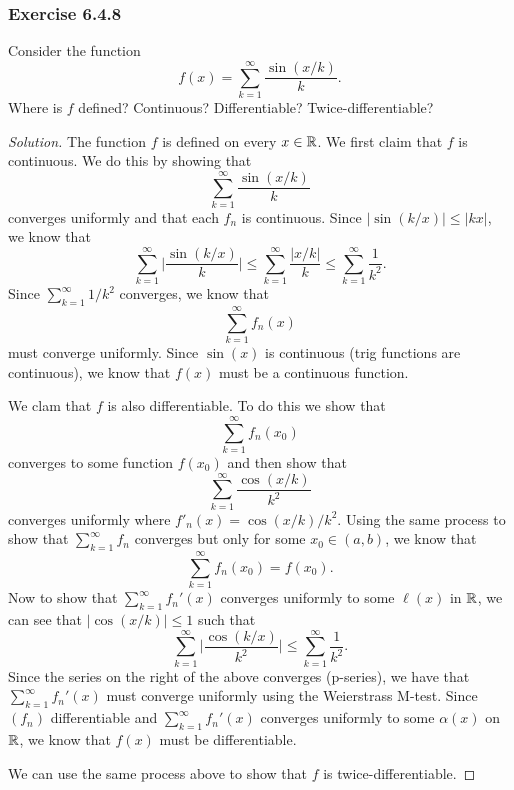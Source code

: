 \subsubsection{Exercise 6.4.8} Consider the function 
\[  f(x) = \sum_{ k=1 }^{  \infty  } \frac{ \sin(x / k) }{ k }.  \]
Where is \( f  \) defined? Continuous? Differentiable? Twice-differentiable?
\begin{proof}[Solution]
The function \( f  \) is defined on every \( x \in \mathbb{R}  \). We first claim that \( f  \) is continuous. We do this by showing that 
\[  \sum_{ k=1 }^{ \infty  } \frac{ \sin(x/k)  }{ k  }  \] converges uniformly and that each \( f_n  \) is continuous. Since \( | \sin(k/x)  |  \leq | kx  |  \), we know that 
\[ \sum_{ k=1 }^{ \infty  } \Big| \frac{ \sin(k/x)  }{  k  }   \Big|  \leq \sum_{ k=1 }^{ \infty  } \frac{ | x/k |   }{ k  } \leq \sum_{ k=1 }^{ \infty  } \frac{ 1 }{ k^2 }.    \]
Since \( \sum_{ k=1 }^{ \infty  } 1 / k^2  \) converges, we know that 
\[  \sum_{ k=1 }^{ \infty  } f_n(x)  \] must converge uniformly. Since \( \sin(x)  \) is continuous (trig functions are continuous), we know that \( f(x)   \) must be a continuous function. 

We clam that \( f  \) is also differentiable. To do this we show that 
\[  \sum_{ k=1 }^{ \infty  } f_n(x_0)  \]
converges to some function \( f(x_0) \) and then show that 
\[  \sum_{ k=1 }^{ \infty  } \frac{ \cos(x / k ) }{ k^2 }  \] converges uniformly where \( f'_n(x) = \cos(x / k ) / k^2  \). Using the same process to show that \( \sum_{ k=1  }^{  \infty  } f_n \) converges but only for some \( x_0 \in (a,b) \), we know that 
\[  \sum_{ k=1 }^{ \infty  } f_n(x_0) = f(x_0). \]
Now to show that \( \sum_{ k=1 }^{ \infty  } f_n'(x)  \) converges uniformly to some \( \ell(x)  \) in \( \mathbb{R}  \), we can see that \( | \cos(x/k)  |  \leq 1  \) such that 
\[  \sum_{ k=1 }^{ \infty  } \Big| \frac{ \cos(k/x) }{ k^2  }   \Big| \leq \sum_{ k=1 }^{ \infty  } \frac{ 1 }{ k^2  }. \]
Since the series on the right of the above converges (p-series), we have that 
\( \sum_{ k=1 }^{ \infty  } f_n'(x)  \) must converge uniformly using the Weierstrass M-test. Since \( (f_n)  \) differentiable and \( \sum_{ k=1 }^{ \infty  } f_n'(x)  \) converges uniformly to some \( \alpha (x)  \) on \( \mathbb{R}  \), we know that \( f(x)  \) must be differentiable. 

We can use the same process above to show that \( f   \) is twice-differentiable.
\end{proof}

